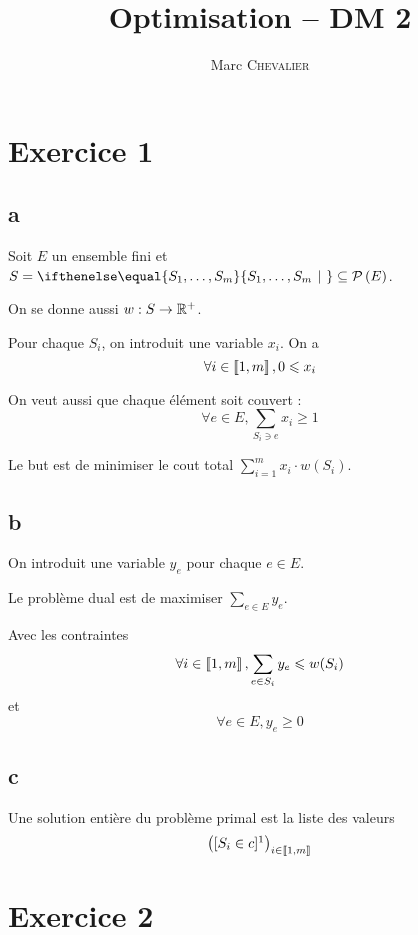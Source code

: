 

\title{Optimisation \--- DM 2}
\author{Marc \textsc{Chevalier}}
\date{}



\maketitle

\section*{Exercice 1}

\subsection*{a}

Soit $E$ un ensemble fini et $S=\set{S_1,\ldots,S_m}{}\subseteq \parties{E}$.

On se donne aussi $w:S\rightarrow \mathbb{R}^+$.

Pour chaque $S_i$, on introduit une variable $x_i$. On a 
\[
    \forall i \in \left\llbracket 1, m \right\rrbracket, 0\leqslant x_i
\]

On veut aussi que chaque élément soit couvert :
\[
    \forall e\in E, \sum\limits_{S_i \ni e} x_i \geqslant 1
\]

Le but est de minimiser le cout total $\sum\limits_{i=1}^m x_i \cdot w(S_i)$.

\subsection*{b}

On introduit une variable $y_e$ pour chaque $e\in E$.

Le problème dual est de maximiser $\sum\limits_{e \in E} y_e$.

Avec les contraintes
\[
    \forall i\in\left\llbracket 1, m \right\rrbracket, \sum\limits_{e\in S_i} y_e \leqslant w(S_i)
\]
et
\[
    \forall e\in E, y_e \geqslant 0
\]

\subsection*{c}

Une solution entière du problème primal est la liste des valeurs
\[
    \big([S_i\in c]\footnotemark\big)_{i\in\entiers{1}{m}}
\]

\section*{Exercice 2}

